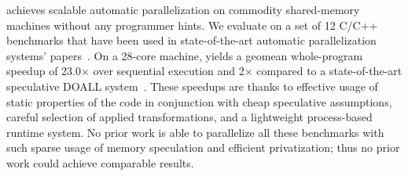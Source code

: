 \name achieves scalable automatic parallelization on commodity
shared-memory machines without any programmer hints.  We evaluate
\name on a set of 12 C/C++ benchmarks that have been used in
state-of-the-art automatic parallelization systems'
papers~\cite{johnson:12:pldi,kim:12:cgo,campanoni:12:cgo}. On a
28-core machine, \name yields a geomean whole-program speedup of
23.0$\times$ over sequential execution and 2$\times$ compared to a
state-of-the-art speculative DOALL system~\cite{johnson:12:pldi}.
These speedups are thanks to effective usage of static properties of
the code in conjunction with cheap speculative assumptions,
%
careful selection of applied transformations, and a lightweight
process-based runtime system.  No prior work is able to parallelize
all these benchmarks with such sparse usage of memory speculation and
efficient privatization; thus no prior work could achieve comparable results.
